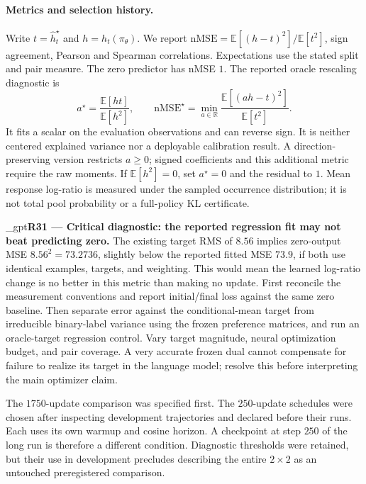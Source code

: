 \documentclass{article}
\makeatletter
\newif\ifshowreviews
\let\revieworiginalref\ref
\newcommand{\reviewref}[1]{%
  \@ifundefined{r@#1}{\textnormal{[original-draft ref.: \texttt{\detokenize{#1}}]}}%
  {\revieworiginalref{#1}}}
\let\ref\reviewref
\newcommand{\reviewresponse}[1]{%
  \ifshowreviews
  \par\begingroup\color{blue!65!black}\hypersetup{allcolors=blue!65!black}\emergencystretch=2em%
  \noindent\textbf{Response:} #1\par\endgroup
  \fi}
\theoremstyle{remark}
\theoremstyle{plain}
\newcommand{\E}{\mathbb{E}}
\newcommand{\R}{\mathbb{R}}
\makeatother
\begin{document}
\paragraph{Metrics and selection history.}
Write $t=\widehat h_t^\star$ and $h=h_t(\pi_\theta)$. We report $\mathrm{nMSE}=\E[(h-t)^2]/\E[t^2]$, sign agreement, Pearson and Spearman correlations. Expectations use the stated split and pair measure. The zero predictor has nMSE $1$. The reported oracle rescaling diagnostic is
\[
a^\star=\frac{\E[ht]}{\E[h^2]},\qquad
\mathrm{nMSE}^\star
=\min_{a\in\R}\frac{\E[(ah-t)^2]}{\E[t^2]}.
\]
It fits a scalar on the evaluation observations and can reverse sign. It is neither centered explained variance nor a deployable calibration result. A direction-preserving version restricts $a\ge0$; signed coefficients and this additional metric require the raw moments. If $\E[h^2]=0$, set $a^\star=0$ and the residual to $1$. Mean response log-ratio is measured under the sampled occurrence distribution; it is not total pool probability or a full-policy KL certificate.


\kekim_gpt{\textbf{R31 --- Critical diagnostic: the reported regression fit may not beat predicting zero.} The existing target RMS of $8.56$ implies zero-output MSE $8.56^2=73.2736$, slightly below the reported fitted MSE $73.9$, if both use identical examples, targets, and weighting. This would mean the learned log-ratio change is no better in this metric than making no update. First reconcile the measurement conventions and report initial/final loss against the same zero baseline. Then separate error against the conditional-mean target from irreducible binary-label variance using the frozen preference matrices, and run an oracle-target regression control. Vary target magnitude, neural optimization budget, and pair coverage. A very accurate frozen dual cannot compensate for failure to realize its target in the language model; resolve this before interpreting the main optimizer claim.}
\reviewresponse{\textbf{R31 --- Partially addressed.} UF development nMSE is $0.5861\pm0.0033$, below the zero-predictor value $1$. Yet fitted-pool KL can worsen while independent objective wins improve. The matched $200$-step pilot improves dev nMSE with prompt-blocked pairs but gives no resolved fresh-response gain on $157$ common prompts. Historical loss conventions and sampling/neural error decomposition remain open; Table~\ref{tab:target-signal} gives descriptive error scales, not causal attribution.}

The $1750$-update comparison was specified first. The $250$-update schedules were chosen after inspecting development trajectories and declared before their runs. Each uses its own warmup and cosine horizon. A checkpoint at step $250$ of the long run is therefore a different condition. Diagnostic thresholds were retained, but their use in development precludes describing the entire $2\times2$ as an untouched preregistered comparison.
\end{document}
